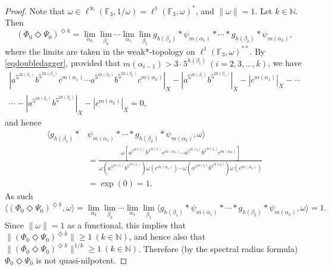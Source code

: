 \documentclass[twoside,11pt]{amsart}
\numberwithin{equation}{section}
\theoremstyle{definition}
\newcommand {\N}{\mathbb N}
\newcommand{\1}{\mathbbm{1}}
\newcommand{\F}{\mathbb F}
\begin{document}
	\begin{proof}
		Note that  $\omega \in \ell^\infty(\F_3, 1/\omega) = \ell^1(\F_3, \omega)^*$, and $\| \omega \| = 1$. Let $k \in \N$.  Then
		$$(\Phi_0 \Diamond \Psi_0)^{\Diamond k} = \lim_{\alpha_k} \lim_{\beta_k} \cdots \lim_{\alpha_1} \lim_{\beta_1} g_{h(\beta_1)}*\psi_{m(\alpha_1)}* \cdots 
		* g_{h(\beta_k)}*\psi_{m(\alpha_k)},$$
		where the limits are taken in the weak*-topology on $\ell^1(\F_3, \omega)^{**}$. 
		By \eqref{eqdoubledagger}, provided that $m(\alpha_{i-1})>3 \cdot 5^{h(\beta_i)} \ (i = 2, 3, \ldots, k)$, we have 
		\begin{multline*}
			\left| a^{5^{2h(\beta_1)}}b^{5^{2h(\beta_1)}} c^{m(\alpha_1)} \cdots 
			a^{5^{2h(\beta_k)}}b^{5^{2h(\beta_k)}} c^{m(\alpha_k)} \right|_X  %
			- \left|  a^{5^{2h(\beta_1)}}b^{5^{2h(\beta_1)}} \right|_X - 
			\left| c^{m(\alpha_1)} \right|_X - 
			\cdots \\
			\cdots
			- \left| a^{5^{2h(\beta_k)}}b^{5^{2h(\beta_k)}} \right|_X 
			-\left| c^{m(\alpha_k)}  \right|_X = 0,
		\end{multline*}
		and hence
		\begin{align*}
			\langle  g_{h(\beta_1)}*&\psi_{m(\alpha_1)}* \cdots 
			* g_{h(\beta_k)}*\psi_{m(\alpha_k)}, \omega \rangle  \\
			&= \frac{\omega \left[ a^{5^{2h(\beta_1)}}b^{5^{2h(\beta_1)}} c^{m(\alpha_1)} \cdots 
				a^{5^{2h(\beta_k)}}b^{5^{2h(\beta_k)}} c^{m(\alpha_k)} \right]}
			{\omega(a^{5^{2h(\beta_1)}}b^{5^{2h(\beta_1)}}) \omega(c^{m(\alpha_1)}) \cdots 
				\omega(a^{5^{2h(\beta_k)}}b^{5^{2h(\beta_k)}}) \omega(c^{m(\alpha_k)})} \\
			&=\exp(0) = 1.
		\end{align*}
		As such
		\begin{equation*}
			\langle (\Phi_0 \Diamond \Psi_0)^{\Diamond k} , \omega \rangle = 
			\lim_{\alpha_k} \lim_{\beta_k} \cdots \lim_{\alpha_1} \lim_{\beta_1} \langle  g_{h(\beta_1)}*\psi_{m(\alpha_1)}* \cdots 
			* g_{h(\beta_k)}*\psi_{m(\alpha_k)}, \omega \rangle = 1. 
		\end{equation*}
		Since $\| \omega \| = 1$ as a functional, this implies that $\|(\Phi_0 \Diamond \Psi_0)^{\Diamond k} \| \geq 1 \ (k \in \N)$, and hence also that  $\|(\Phi_0 \Diamond \Psi_0)^{\Diamond k} \|^{1/k} \geq 1 \ (k \in \N)$. Therefore (by the spectral radius formula) $\Phi_0 \Diamond \Psi_0$ is not quasi-nilpotent.
	\end{proof}
	
\end{document}
